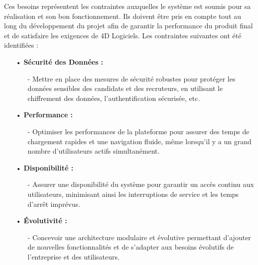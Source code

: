 Ces besoins représentent les 
contraintes auxquelles le système est soumis pour sa réalisation et son bon 
fonctionnement. Ils doivent être pris en compte tout au long du développement 
du projet afin de garantir la performance du produit final et de satisfaire les 
exigences de 4D Logiciels. Les contraintes suivantes ont 
été identifiées :

\begin{itemize}
    \setlength{\itemsep}{0.3cm}
    \item[•] \textbf{ Sécurité des Données :}
    \begin{itemize}
        \setlength{\itemsep}{0.2cm}
        \item[-] Mettre en place des mesures de sécurité robustes pour protéger les 
        données sensibles des candidats et des recruteurs, en utilisant le 
        chiffrement des données, l'authentification sécurisée, etc.        
    \end{itemize}
    \item[•] \textbf{Performance :}
    \begin{itemize}
        \setlength{\itemsep}{0.2cm}
        \item[-]Optimiser les performances de la plateforme pour assurer des temps 
        de chargement rapides et une navigation fluide, même lorsqu'il y a 
        un grand nombre d'utilisateurs actifs simultanément.
    \end{itemize}
    \item[•] \textbf{Disponibilité :}
    \begin{itemize}
        \setlength{\itemsep}{0.2cm}
        \item[-] Assurer une disponibilité du système pour garantir un accès 
        continu aux utilisateurs, minimisant ainsi les interruptions de service 
        et les temps d'arrêt imprévus.\\

    \end{itemize}
    \item[•] \textbf{Évolutivité :}
    \begin{itemize}
        \setlength{\itemsep}{0.2cm}
        \item[-] Concevoir une architecture modulaire et évolutive permettant 
        d'ajouter de nouvelles fonctionnalités et de s'adapter aux besoins évolutifs 
        de l'entreprise et des utilisateurs.
    \end{itemize}
\end{itemize}


